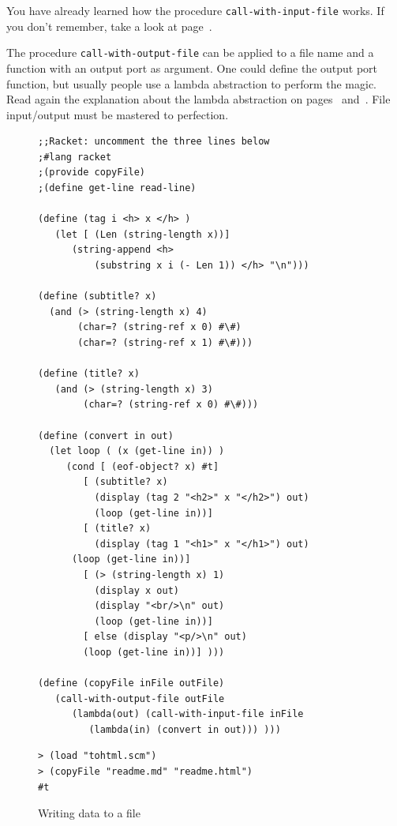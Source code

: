 \documentclass[a4paper,12pt]{book}
\newenvironment{fmpage}[1]
{\begin{lrbox}{\fmbox}\begin{minipage}{#1}}
{\end{minipage}\end{lrbox}\fbox{\usebox{\fmbox}}}
\begin{document}
You have already learned how the
procedure \verb|call-with-input-file| works.
If you don't remember, take a look at
page~\pageref{page:call-with-input-file}.

The procedure
\verb|call-with-output-file|
can be
applied to a file name and a function
with an output port as argument. One could
define the output port function, but
usually people use a lambda abstraction
to perform the magic. Read again the
explanation about the lambda abstraction
on pages~\pageref{page:lambda1}
and~\pageref{page:lambda2}. File input/output
must be mastered to perfection.

\begin{figure}[!h]
\begin{fmpage}{\linewidth}
\begin{verbatim}
;;Racket: uncomment the three lines below
;#lang racket
;(provide copyFile)
;(define get-line read-line)

(define (tag i <h> x </h> )
   (let [ (Len (string-length x))]
      (string-append <h>
          (substring x i (- Len 1)) </h> "\n")))

(define (subtitle? x)
  (and (> (string-length x) 4)
       (char=? (string-ref x 0) #\#)
       (char=? (string-ref x 1) #\#)))

(define (title? x)
   (and (> (string-length x) 3)
        (char=? (string-ref x 0) #\#)))

(define (convert in out)
  (let loop ( (x (get-line in)) )
     (cond [ (eof-object? x) #t]
        [ (subtitle? x)
          (display (tag 2 "<h2>" x "</h2>") out)
          (loop (get-line in))]
        [ (title? x)
          (display (tag 1 "<h1>" x "</h1>") out)
	  (loop (get-line in))]
        [ (> (string-length x) 1)
          (display x out)
          (display "<br/>\n" out)
          (loop (get-line in))]
        [ else (display "<p/>\n" out)
	    (loop (get-line in))] )))

(define (copyFile inFile outFile)
   (call-with-output-file outFile
      (lambda(out) (call-with-input-file inFile
         (lambda(in) (convert in out))) )))
\end{verbatim}
\end{fmpage}

\begin{fmpage}{\linewidth}
\begin{verbatim}
> (load "tohtml.scm")
> (copyFile "readme.md" "readme.html")
#t
\end{verbatim}
\end{fmpage}
\caption{Writing data to a file}
\label{wrtFile}
\end{figure}
\end{document}
